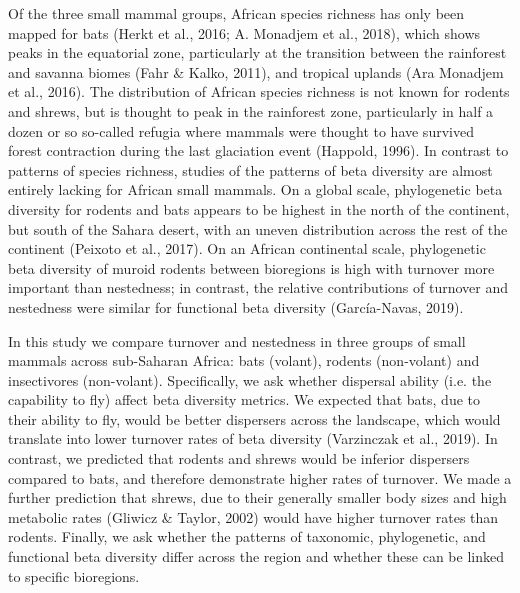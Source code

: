 \documentclass{article}
\begin{document}
\vspace{5mm}
Of the three small mammal groups, African species richness has only been mapped for bats (Herkt et al., 2016; A. Monadjem et al., 2018), which shows peaks in the equatorial zone, particularly at the transition between the rainforest and savanna biomes (Fahr \& Kalko, 2011), and tropical uplands (Ara Monadjem et al., 2016). The distribution of African species richness is not known for rodents and shrews, but is thought to peak in the rainforest zone, particularly in half a dozen or so so-called refugia where mammals were thought to have survived forest contraction during the last glaciation event (Happold, 1996). In contrast to patterns of species richness, studies of the patterns of beta diversity are almost entirely lacking for African small mammals. On a global scale, phylogenetic beta diversity %
for rodents and bats appears to be highest in the north of the continent, but south of the Sahara desert, with an uneven distribution across the rest of the continent (Peixoto et al., 2017). On an African continental scale, phylogenetic beta diversity of muroid rodents between bioregions is high with turnover more important than nestedness; in contrast, the relative contributions of turnover and nestedness were similar for functional beta diversity (García-Navas, 2019). 

\vspace{5mm}
In this study we compare turnover and nestedness in three groups of small mammals across sub-Saharan Africa: bats (volant), rodents (non-volant) and insectivores (non-volant). Specifically, we ask whether dispersal ability (i.e. the capability to fly) affect beta diversity metrics. We expected that bats, due to their ability to fly, would be better dispersers across the landscape, which would translate into lower turnover rates of beta diversity (Varzinczak et al., 2019). In contrast, we predicted that rodents and shrews would be inferior dispersers compared to bats, and therefore demonstrate higher rates of turnover. We made a further prediction that shrews, due to their generally smaller body sizes and high metabolic rates (Gliwicz \& Taylor, 2002) would have higher turnover rates than rodents. Finally, we ask whether the patterns of taxonomic, phylogenetic, and functional beta diversity differ across the region and whether these can be linked to specific bioregions.  
\end{document}
